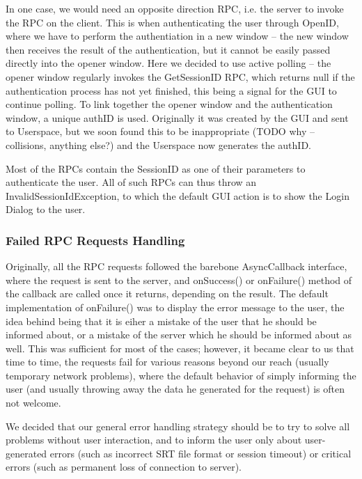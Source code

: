 In one case, we would need an opposite direction RPC, i.e. the server to invoke the RPC on the client. This is when authenticating the user through OpenID, where we have to perform the authentiation in a new window -- the new window then receives the result of the authentication, but it cannot be easily passed directly into the opener window. Here we decided to use active polling -- the opener window regularly invokes the GetSessionID RPC, which returns null if the authentication process has not yet finished, this being a signal for the GUI to continue polling. To link together the opener window and the authentication window, a unique authID is used. Originally it was created by the GUI and sent to Userspace, but we soon found this to be inappropriate (TODO why -- collisions, anything else?) and the Userspace now generates the authID.

Most of the RPCs contain the SessionID as one of their parameters to authenticate the user. All of such RPCs can thus throw an InvalidSessionIdException, to which the default GUI action is to show the Login Dialog to the user.

\subsubsection{Failed RPC Requests Handling}

Originally, all the RPC requests followed the barebone AsyncCallback interface, where the request is sent to the server, and onSuccess() or onFailure() method of the callback are called once it returns, depending on the result. The default implementation of onFailure() was to display the error message to the user, the idea behind being that it is eiher a mistake of the user that he should be informed about, or a mistake of the server which he should be informed about as well. This was sufficient for most of the cases; however, it became clear to us that time to time, the requests fail for various reasons beyond our reach (usually temporary network problems), where the default behavior of simply informing the user (and usually throwing away the data he generated for the request) is often not welcome.

We decided that our general error handling strategy should be to try to solve all problems without user interaction, and to inform the user only about user-generated errors (such as incorrect SRT file format or session timeout) or critical errors (such as permanent loss of connection to server).

